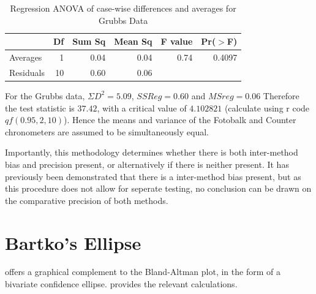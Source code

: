 \documentclass[12pt, a4paper]{report}
\theoremstyle{plain}
\theoremstyle{definition}
\theoremstyle{remark}
\begin{document}
	\newpage
	
	\begin{table}[ht]
		\begin{center}
			\begin{tabular}{lrrrrr}
				\hline
				& Df & Sum Sq & Mean Sq & F value & Pr($>$F) \\
				\hline
				Averages & 1 & 0.04 & 0.04 & 0.74 & 0.4097 \\
				Residuals & 10 & 0.60 & 0.06 &  &  \\
				\hline
			\end{tabular}
			\caption{Regression ANOVA of case-wise differences and averages
				for Grubbs Data}
		\end{center}
	\end{table}
	
	
	
	
	For the Grubbs data, $\Sigma D^{2}=5.09 $, $SSReg = 0.60$ and
	$MSreg=0.06$ Therefore the test statistic is $37.42$, with a
	critical value of $4.102821$ (calculate using r code
	$qf(0.95,2,10)$). Hence the means and variance of the Fotobalk and
	Counter chronometers are assumed to be simultaneously equal.
	
	Importantly, this methodology determines whether there is both
	inter-method bias and precision present, or alternatively if there
	is neither present. It has previously been demonstrated that there
	is a inter-method bias present, but as this procedure does not
	allow for seperate testing, no conclusion can be drawn on the
	comparative precision of both methods.
	
	\section{Bartko's Ellipse}
	\citet{Bartko} offers a graphical complement to the Bland-Altman
	plot, in the form of a bivariate confidence ellipse.
	\citet{AltmanEllipse} provides the relevant calculations.
	
\end{document}
